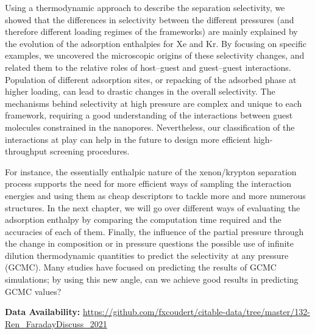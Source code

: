 \documentclass[main.tex]{subfiles}
\begin{document}
Using a thermodynamic approach to describe the separation selectivity, we showed that the differences in selectivity between the different pressures (and therefore different loading regimes of the frameworks) are mainly explained by the evolution of the adsorption enthalpies for Xe and Kr. By focusing on specific examples, we uncovered the microscopic origins of these selectivity changes, and related them to the relative roles of host--guest and guest--guest interactions. Population of different adsorption sites, or repacking of the adsorbed phase at higher loading, can lead to drastic changes in the overall selectivity. The mechanisms behind selectivity at high pressure are complex and unique to each framework, requiring a good understanding of the interactions between guest molecules constrained in the nanopores. Nevertheless, our classification of the interactions at play can help in the future to design more efficient high-throughput screening procedures.

For instance, the essentially enthalpic nature of the xenon/krypton separation process supports the need for more efficient ways of sampling the interaction energies and using them as cheap descriptors to tackle more and more numerous structures. In the next chapter, we will go over different ways of evaluating the adsorption enthalpy by comparing the computation time required and the accuracies of each of them. Finally, the influence of the partial pressure through the change in composition or in pressure questions the possible use of infinite dilution thermodynamic quantities to predict the selectivity at any pressure (GCMC). Many studies have focused on predicting the results of GCMC simulations;\autocite{Simon_2015,Shi_2023,Kang_2023,Li_2023} by using this new angle, can we achieve good results in predicting GCMC values?

\textbf{Data Availability:} \url{https://github.com/fxcoudert/citable-data/tree/master/132-Ren_FaradayDiscuss_2021}

\OnlyInSubfile{\printglobalbibliography}
\end{document}
